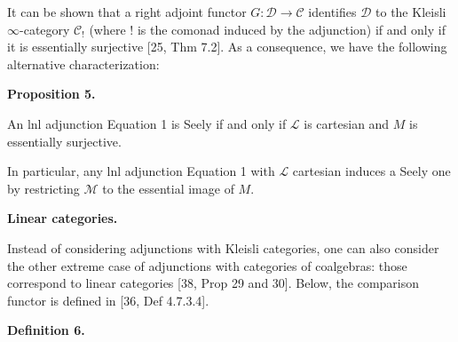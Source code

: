 \documentclass[10pt,a4paper]{article}
\begin{document}
 
 
 
It can be shown that a right adjoint functor $G:\mathcal{D}\to\mathcal{C}$ identifies ${\mathcal{D}}$ to the Kleisli $\infty$-category ${\mathcal{C}}_{\mathop{!}}$ (where $\mathop{!}$ is the comonad induced by the adjunction) if and only if it is essentially surjective [25, Thm 7.2]. As a consequence, we have the following alternative characterization:\par
 
 
 
\par\medskip\noindent\textbf{Proposition 5.}\par
 
 
An lnl adjunction Equation 1 is Seely if and only if ${\mathcal{L}}$ is cartesian and $M$ is essentially surjective.\par
 
 
 
 
In particular, any lnl adjunction Equation 1 with ${\mathcal{L}}$ cartesian induces a Seely one by restricting ${\mathcal{M}}$ to the essential image of $M$.\par
 
 
 
 
\par\medskip\noindent\textbf{Linear categories.}\par
 
 
Instead of considering adjunctions with Kleisli categories, one can also consider the other extreme case of adjunctions with categories of coalgebras: those correspond to linear categories [38, Prop 29 and 30]. Below, the comparison functor is defined in [36, Def 4.7.3.4].\par
 
 
 
\par\medskip\noindent\textbf{Definition 6.}\par
 
\end{document}
